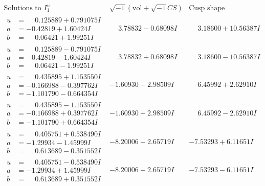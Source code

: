 \documentclass[1p]{elsarticle_modified}
\theoremstyle{definition}
\newcommand{\I}{\sqrt{-1}}
\begin{document}
$$\begin{array}{c|c|c}  
\text{Solutions to }I^u_{1}& \I (\text{vol} + \sqrt{-1}CS) & \text{Cusp shape}\\
 \hline 
\begin{aligned}
u &= \phantom{-}0.125889 + 0.791075 I \\
a &= -0.42819 + 1.60424 I \\
b &= \phantom{-}0.06421 + 1.99251 I\end{aligned}
 & \phantom{-}3.78832 - 0.68098 I & \phantom{-}3.18600 + 10.56387 I \\ \hline\begin{aligned}
u &= \phantom{-}0.125889 - 0.791075 I \\
a &= -0.42819 - 1.60424 I \\
b &= \phantom{-}0.06421 - 1.99251 I\end{aligned}
 & \phantom{-}3.78832 + 0.68098 I & \phantom{-}3.18600 - 10.56387 I \\ \hline\begin{aligned}
u &= \phantom{-}0.435895 + 1.153550 I \\
a &= -0.166988 - 0.397762 I \\
b &= -1.101790 - 0.664354 I\end{aligned}
 & -1.60930 - 2.98509 I & \phantom{-}6.45992 + 2.62910 I \\ \hline\begin{aligned}
u &= \phantom{-}0.435895 - 1.153550 I \\
a &= -0.166988 + 0.397762 I \\
b &= -1.101790 + 0.664354 I\end{aligned}
 & -1.60930 + 2.98509 I & \phantom{-}6.45992 - 2.62910 I \\ \hline\begin{aligned}
u &= \phantom{-}0.405751 + 0.538490 I \\
a &= -1.29934 - 1.45999 I \\
b &= \phantom{-}0.613689 - 0.351552 I\end{aligned}
 & -8.20006 - 2.65719 I & -7.53293 + 6.11651 I \\ \hline\begin{aligned}
u &= \phantom{-}0.405751 - 0.538490 I \\
a &= -1.29934 + 1.45999 I \\
b &= \phantom{-}0.613689 + 0.351552 I\end{aligned}
 & -8.20006 + 2.65719 I & -7.53293 - 6.11651 I \\ \hline\begin{aligned}

\end{aligned}
\end{array}$$
\end{document}
